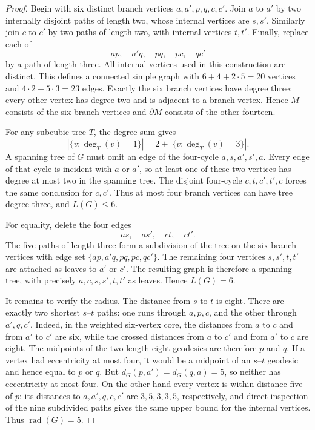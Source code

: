 \documentclass[11pt,a4paper]{article}
\theoremstyle{remark}
\begin{document}
\begin{proof}
Begin with six distinct branch vertices $a,a',p,q,c,c'$.
Join $a$ to $a'$ by two internally disjoint paths of length two, whose
internal vertices are $s,s'$.  Similarly join $c$ to $c'$ by two paths of
length two, with internal vertices $t,t'$.  Finally, replace each of
\[
 ap,\quad a'q,\quad pq,\quad pc,\quad qc'
\]
by a path of length three.  All internal vertices used in this construction
are distinct.  This defines a connected simple graph with
$6+4+2\cdot5=20$ vertices and $4\cdot2+5\cdot3=23$ edges.
Exactly the six branch vertices have degree three; every other vertex has
degree two and is adjacent to a branch vertex.  Hence $M$ consists of the
six branch vertices and $\partial M$ consists of the other fourteen.

For any subcubic tree $T$, the degree sum gives
\[
 |\{v:\deg_T(v)=1\}|=2+|\{v:\deg_T(v)=3\}|.
\]
A spanning tree of $G$ must omit an edge of the four-cycle
$a,s,a',s',a$.  Every edge of that cycle is incident with $a$ or $a'$, so
at least one of these two vertices has degree at most two in the spanning
tree.  The disjoint four-cycle $c,t,c',t',c$ forces the same conclusion for
$c,c'$.  Thus at most four branch vertices can have tree degree three, and
$L(G)\le6$.

For equality, delete the four edges
\[
 as,\quad as',\quad ct,\quad ct'.
\]
The five paths of length three form a subdivision of the tree on the six
branch vertices with edge set $\{ap,a'q,pq,pc,qc'\}$.
The remaining four vertices $s,s',t,t'$ are attached as leaves to $a'$ or
$c'$.  The resulting graph is therefore a spanning tree, with precisely
$a,c,s,s',t,t'$ as leaves.  Hence $L(G)=6$.

It remains to verify the radius.  The distance from $s$ to $t$ is eight.
There are exactly two shortest $s$--$t$ paths: one runs through $a,p,c$,
and the other through $a',q,c'$.  Indeed, in the weighted six-vertex core,
the distances from $a$ to $c$ and from $a'$ to $c'$ are six, while the
crossed distances from $a$ to $c'$ and from $a'$ to $c$ are eight.
The midpoints of the two length-eight geodesics are therefore $p$ and $q$.
If a vertex had eccentricity at most four, it would be a midpoint of an
$s$--$t$ geodesic and hence equal to $p$ or $q$.
But $d_G(p,a')=d_G(q,a)=5$, so neither has eccentricity at most four.
On the other hand every vertex is within distance five of $p$:
its distances to $a,a',q,c,c'$ are $3,5,3,3,5$, respectively, and direct
inspection of the nine subdivided paths gives the same upper bound for
the internal vertices.  Thus $\operatorname{rad}(G)=5$.
\end{proof}
\end{document}
